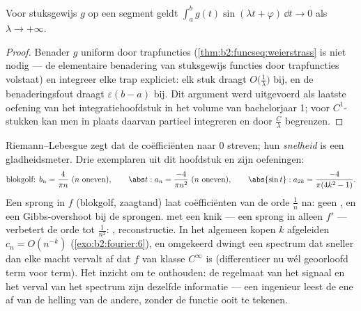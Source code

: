 \begin{theorem}\label{thm:b2:fourier:riemannlebesgue}
Voor stuksgewijs  $g$ op een segment geldt $\int_a^b
g(t)\sin(\lambda t + \varphi)\,\dd t \to 0$ als $\lambda \to
+\infty$.
\end{theorem}

\begin{proof}
Benader $g$ uniform door trapfuncties
(\cref{thm:b2:funcseq:weierstrass} is niet nodig --- de
elementaire benadering van stuksgewijs  functies door
trapfuncties volstaat) en integreer elke trap expliciet: elk stuk
draagt $O\bigl(\frac1\lambda\bigr)$ bij, en de benaderingsfout
draagt $\varepsilon(b - a)$ bij. Dit argument werd 
uitgevoerd als laatste oefening van het integratiehoofdstuk in het
volume van bachelorjaar 1; voor $C^1$-stukken kan men in plaats
daarvan partieel integreren en door $\frac C\lambda$ begrenzen.
\end{proof}

\begin{example}\label{ex:b2:fourier:decaytable}
Riemann--Lebesgue zegt dat de coëfficiënten naar $0$ streven; hun
\emph{snelheid} is een gladheidsmeter. Drie exemplaren uit dit
hoofdstuk en zijn oefeningen:
\[
\text{blokgolf: } b_n = \frac{4}{\pi n}\ (n\ \text{oneven}),
\qquad
\abs t : a_n = \frac{-4}{\pi n^2}\ (n\ \text{oneven}),
\qquad
\abs{\sin t} : a_{2k} = \frac{-4}{\pi(4k^2-1)} .
\]
Een sprong in $f$ (blokgolf, zaagtand) laat coëfficiënten van de
orde $\frac1n$ na: geen , en een
Gibbs-overshoot bij de sprongen.  met een knik --- een
sprong in alleen $f'$ --- verbetert de orde tot $\frac{1}{n^2}$:
,  reconstructie. In het algemeen
kopen $k$ afgeleiden $c_n = O(n^{-k})$ (\cref{exo:b2:fourier:6}),
en omgekeerd dwingt een spectrum dat sneller dan elke macht
vervalt af dat $f$ van klasse $C^\infty$ is (differentieer nu wél
geoorloofd term voor term). Het inzicht om te onthouden: de
regelmaat van het signaal en het verval van het spectrum zijn
dezelfde informatie --- een ingenieur leest de ene af van de
helling van de andere, zonder de functie ooit te tekenen.
\end{example}

